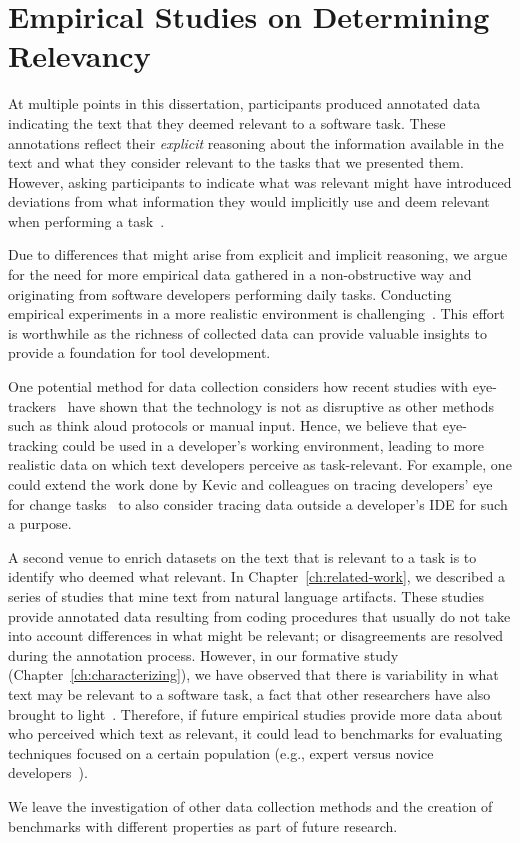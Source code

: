 






\section{Empirical Studies on Determining Relevancy}
\label{cp7:empirical-studies}




At multiple points in this dissertation, participants produced annotated data 
indicating the text that they deemed relevant to a software task. 
These annotations reflect their \textit{explicit} reasoning about the information 
available in the text and what they consider relevant to the tasks 
that we presented them. However, 
asking participants to indicate what was relevant might have 
introduced deviations from what information
they would implicitly use and deem relevant 
when performing a task~\cite{Lazar2017}.




Due to differences that might arise from explicit and implicit reasoning,
 we argue for the need for more empirical data gathered in a non-obstructive way
and originating from software developers performing daily tasks.
Conducting empirical
 experiments in a more realistic environment is challenging~\cite{Kevic2015}.
This effort is worthwhile as
the richness of collected data can provide valuable insights
to provide a foundation for tool development.


One potential method for
data collection 
considers 
how recent studies with eye-trackers~\cite{Cutrell2007, Petrusel2013, sharafi2020}
have shown that the technology is not as disruptive as other 
methods such as think aloud protocols or manual input. 
Hence, we believe that eye-tracking 
could be used in a developer's working environment, 
leading to more realistic data on which text developers perceive as task-relevant.
For example, one could
extend the work done by Kevic and colleagues on
tracing developers' eye for change tasks~\cite{Kevic2015} to
also consider tracing data outside a developer's IDE
for such a purpose.




A second venue to enrich datasets on the text that is relevant to a task 
is to identify who deemed what relevant. 
In Chapter~\ref{ch:related-work}, we described 
a series of studies that mine text from natural language artifacts.
These studies provide annotated data 
resulting from coding procedures that usually do not take into account
differences in what might be relevant; or disagreements are resolved during the annotation process. 
However, in our formative study (Chapter~\ref{ch:characterizing}),
we have observed that there is variability in what text may be relevant 
to a software task, a fact that other researchers have also brought to light~\cite{Bavota2016,Robillard2015}.
Therefore, if future empirical studies
provide more data about who perceived which text as relevant, it could lead to benchmarks 
for evaluating techniques
focused on a certain population  (e.g., expert versus novice developers~\cite{Crosby1990, Busjahn2015}). 





We leave the investigation of other data collection methods 
and the creation of benchmarks with different properties
as part of future research.






